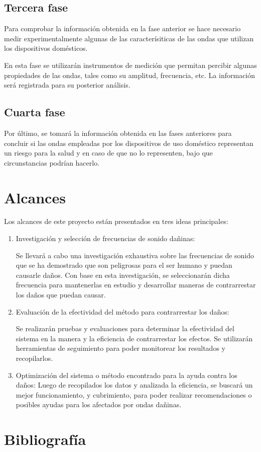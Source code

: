 \documentclass[spanish,notitlepage,letterpaper, 12pt]{article}
\begin{document}
\subsection{Tercera fase}
Para comprobar la información obtenida en la fase anterior se hace necesario medir experimentalmente algunas de las caracterísiticas de las ondas que utilizan los dispositivos domésticos.\par
\bigskip
En esta fase se utilizarán instrumentos de medición que permitan percibir algunas propiedades de las ondas, tales como su amplitud, frecuencia, etc. La información será registrada para su posterior análisis.
\subsection{Cuarta fase}
Por último, se tomará la información obtenida en las fases anteriores para concluir si las ondas empleadas por los dispositivos de uso doméstico representan un riesgo para la salud y en caso de que no lo representen, bajo que circunstancias podrían hacerlo.
\section{Alcances}
Los alcances de este proyecto están presentados en tres ideas principales:
\begin{enumerate}
    \item Investigación y selección de frecuencias de sonido dañinas:\par
        Se llevará a cabo una investigación exhaustiva sobre las frecuencias de sonido que se ha demostrado que son peligrosas para el ser humano y puedan causarle daños. Con base en esta investigación, se seleccionarán dicha frecuencia para mantenerlas en estudio y desarrollar maneras de contrarrestar los daños que puedan causar.
    \item Evaluación de la efectividad del método para contrarrestar los daños:\par
        Se realizarán pruebas y evaluaciones para determinar la efectividad del sistema en la manera y la eficiencia de contrarrestar los efectos. Se utilizarán herramientas de seguimiento para poder monitorear los resultados y recopilarlos.
    \item Optimización del sistema o método encontrado para la ayuda contra los daños:
        Luego de recopilados los datos y analizada la eficiencia, se buscará un mejor funcionamiento, y cubrimiento, para poder realizar recomendaciones o posibles ayudas para los afectados por ondas dañinas. 
\end{enumerate}
\section{Bibliografía} 


\end{document}
